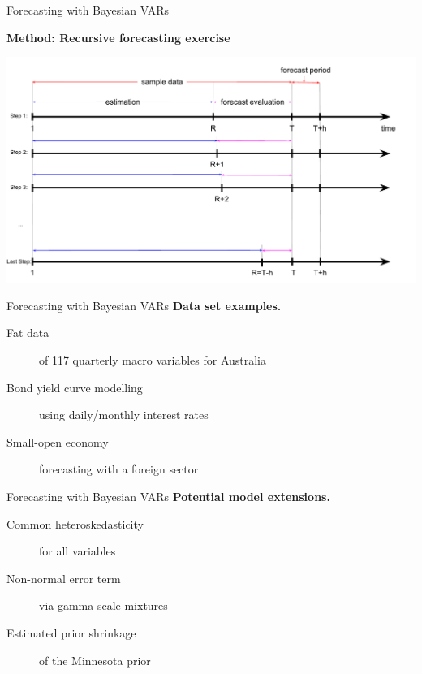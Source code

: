 \documentclass[notes,blackandwhite,mathsans]{beamer}
\begin{document}
\begin{frame}{Forecasting with Bayesian VARs}

\centering
\bigskip\textbf{Method: Recursive forecasting exercise}

\bigskip
\includegraphics[scale=0.4]{grphs/06recursive}
\end{frame}





\begin{frame}{Forecasting with Bayesian VARs}
\textbf{Data set examples. }
\bigskip
\begin{description}
\item[Fat data] {\color{mcxs2}of 117 quarterly macro variables for Australia} \\ [1ex]
\item[Bond yield curve modelling] {\color{mcxs2}using daily/monthly interest rates} \\ [1ex]
\item[Small-open economy] {\color{mcxs2}forecasting with a foreign sector} \\ [1ex]
\item[] {\color{mcxs2} }
\end{description}
\end{frame}



\begin{frame}{Forecasting with Bayesian VARs}
\textbf{Potential model extensions. }
\bigskip
\begin{description}
\item[Common heteroskedasticity] {\color{mcxs2}for all variables}\\ [1ex]
\item[Non-normal error term] {\color{mcxs2}via gamma-scale mixtures}\\ [1ex]
\item[Estimated prior shrinkage] {\color{mcxs2}of the Minnesota prior}\\ [1ex]
\item[] {\color{mcxs2} }
\end{description}
\end{frame}
\end{document}
